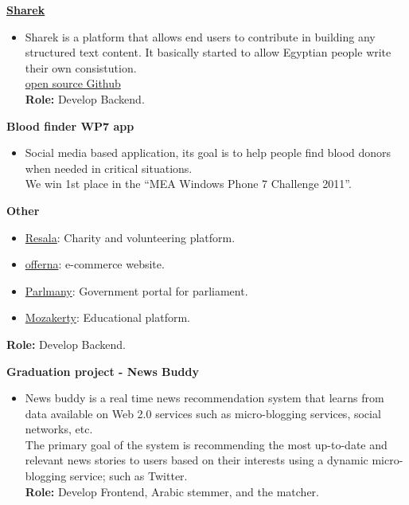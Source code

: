 \documentclass[10pt]{article}
\newenvironment{innerlist}[1][\enskip\textbullet]%
        {\begin{itemize}[#1,leftmargin=*,parsep=0pt,itemsep=0pt,topsep=0pt,partopsep=0pt]}
        {\end{itemize}}
\begin{document}
\vspace{+2mm}
\textbf {\href{http://sharek.dostour.eg/}{Sharek}}
\begin{innerlist}
\item[] Sharek is a platform that allows end users to contribute in building any structured text content. It basically started to allow Egyptian people write their own consistution.\\
\href{https://github.com/espace/sharek}{open source Github}\\
\textbf{Role:} Develop Backend.
\end{innerlist}

\vspace{+2mm}
\textbf {Blood finder WP7 app}
\begin{innerlist}
\item[] Social media based application, its goal is to help people find blood donors when needed in critical situations.\\
We win 1st place in the “MEA Windows Phone 7 Challenge 2011”.
\end{innerlist}


\textbf {Other}
\begin{innerlist}
\item \href{http://www.resala.org/}{Resala}: Charity and volunteering platform.
\item \href{http://www.offerna.com/}{offerna}: e-commerce website. 
\item \href{http://www.parlmany.org/}{Parlmany}: Government portal for parliament. 
\item \href{http://www.mozakerty.com/}{Mozakerty}: Educational platform.
\end{innerlist}
\hspace{+1mm} \textbf{Role:} Develop Backend.

\vspace{+2mm}
\textbf {Graduation project - News Buddy}
\begin{innerlist}
\item[] News buddy is a real time news recommendation system that learns from data
available on Web 2.0 services such as micro-blogging services, social networks, etc.\\
The primary goal of the system is recommending the most up-to-date and
relevant news stories to users based on their interests using a dynamic micro-blogging
service; such as Twitter.\\
\textbf{Role:} Develop Frontend, Arabic stemmer, and the matcher.
\end{innerlist}
\end{document}
